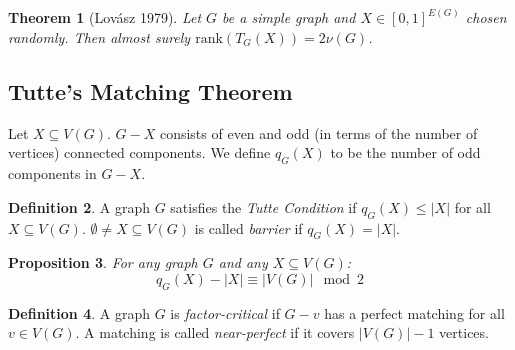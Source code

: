 \documentclass[11pt, a4paper]{article}
\newcommand{\abs}[1]{\left\lvert#1\right\rvert}
\newtheorem{theorem}{Theorem}[section]
\newtheorem{prop}[theorem]{Proposition}
\theoremstyle{remark}
\theoremstyle{definition}
\newtheorem{definition}[theorem]{Definition}
\begin{document}
\begin{theorem}[Lovász 1979]
	Let $G$ be a simple graph and $X\in [0,1]^{E(G)}$ chosen randomly.
	Then almost surely $\mathrm{rank}(T_G(X))=2\nu(G)$.
\end{theorem}


\subsection{Tutte's Matching Theorem}
Let $X\subseteq V(G)$. $G-X$ consists of even and odd (in terms of the
number of vertices) connected components. We define $q_G(X)$ to be the
number of odd components in $G-X$.

\begin{figure}[tbh]
	\centering
\end{figure}

\begin{definition}
	A graph $G$ satisfies the \emph{Tutte Condition} if $q_G(X)\leq\abs{X}$
	for all $X\subseteq V(G)$. $\emptyset\neq X\subseteq V(G)$ is called
	\emph{barrier} if $q_G(X)=\abs{X}$.
\end{definition}

\begin{prop}\label{prop:tutte-even}
	For any graph $G$ and any $X\subseteq V(G)$:
	\[q_G(X)-\abs{X} \equiv \abs{V(G)}\mod 2\]
\end{prop}

\begin{definition}
	A graph $G$ is \emph{factor-critical} if $G-v$ has a perfect matching
	for all $v\in V(G)$. A matching is called \emph{near-perfect} if it
	covers $\abs{V(G)}-1$ vertices.
\end{definition}
\end{document}
